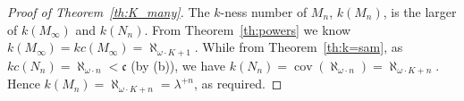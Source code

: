 \documentclass[10pt,a4paper]{amsart}
\begin{document}
\begin{proof}[Proof of  Theorem~\ref{th:K_many}]
The $k$-ness number of $M_n$, $k(M_n)$, is the larger of $k(M_\infty)$ and $k(N_n)$. 
From Theorem~\ref{th:powers} we know 
$k(M_\infty)=kc(M_\infty)=\aleph_{\omega\cdot K+1}$. 
While from Theorem~\ref{th:k=sam}, as $kc(N_n)=\aleph_{\omega\cdot n}<\mathfrak{c}$ (by (b)), we have $k(N_n)=\mathop{cov}(\aleph_{\omega\cdot n})=\aleph_{\omega\cdot K+n}$. 
Hence $k(M_n)=\aleph_{\omega\cdot K+n}=\lambda^{+n}$, as required.    
\end{proof}
\end{document}
